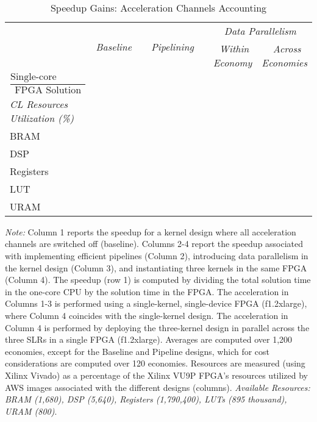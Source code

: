 \documentclass[12pt,american]{article}
\makeatletter
\newcommand{\resultsfolder}{./results}
\newcommand{\devfpgaI}{fpgaI}
\newcommand{\devcpu}{cpu-cores}
\newcommand{\nKMIkI}{nKM4-nk100}
\newcommand{\knlI}{knl-1}
\newcommand{\cpucoreI}{1}
\newcommand{\awsinstfI}{f1.2xlarge\@\xspace}
\newcommand{\fpgaspeedICPUI}{}
\newcommand{\fpgaspeedIknlICPUInKMIkI}{}
\newcommand{\fpgaIbasespeedcpuIbasenKMIkI}{}
\newcommand{\fpgaIpipspeedcpuIbasenKMIkI}{}
\newcommand{\baselineBRAM}{}
\newcommand{\baselineDSP}{}
\newcommand{\baselineRegisters}{}
\newcommand{\baselineLUTs}{}
\newcommand{\baselineURAM}{}
\newcommand{\pipelinenBRAM}{}
\newcommand{\pipelineDSP}{}
\newcommand{\pipelineRegisters}{}
\newcommand{\pipelineLUTs}{}
\newcommand{\pipelineURAM}{}
\newcommand{\withindataparallelBRAM}{}
\newcommand{\withindataparallelDSP}{}
\newcommand{\withindataparallelRegisters}{}
\newcommand{\withindataparallelLUTs}{}
\newcommand{\withindataparallelURAM}{}
\newcommand{\acrossdataparallelBRAM}{}
\newcommand{\acrossdataparallelDSP}{}
\newcommand{\acrossdataparallelRegisters}{}
\newcommand{\acrossdataparallelLUTs}{}
\newcommand{\acrossdataparallelURAM}{}
\newcommand{\CLdesignLUT}{895 thousand}
\newcommand{\CLdesignDSP}{5,640}
\newcommand{\CLdesignRegisters}{1,790,400}
\newcommand{\CLdesignBRAM}{1,680}
\newcommand{\CLdesignURAM}{800}
\makeatother
\begin{document}
\newcommand{\xx}{0.22in}
\begin{table}[ht!]
\setlength\tabcolsep{0pt}
\caption{Speedup Gains: Acceleration Channels Accounting}
\vspace{-0.1in}
\begin{center}
\begin{tabular}{l@{\hskip \xx}c@{\hskip \xx}c@{\hskip \xx} c@{\hskip \xx}c@{\hskip \xx}c@{\hskip \xx} c@{\hskip \xx}}
\toprule
&
\multirow{2}{*}{\textit{Baseline}}&&
\multirow{2}{*}{\textit{Pipelining}} && 
\multicolumn{2}{c}{\textit{Data Parallelism}}\\
\cmidrule{6-7}
&&&&
&\parbox[c]{1.5cm}{\,\,\textit{Within}\\ \textit{Economy}}
&\parbox[c]{1.5cm}{\,\,\,\textit{Across}\\ \textit{Economies}}\\
\parbox[l][1.cm]{3.7cm}{
\footnotesize{$\dfrac{\text{Single-core Execution}}{\text{FPGA Solution}}$}}
&\fpgaIbasespeedcpuIbasenKMIkI&&
\fpgaIpipspeedcpuIbasenKMIkI&&
\fpgaspeedIknlICPUInKMIkI&
\fpgaspeedICPUI\\
\textit{CL Resources Utilization (\%)}\\
BRAM&\baselineBRAM &&\pipelinenBRAM &&\withindataparallelBRAM &\acrossdataparallelBRAM \\
DSP&\baselineDSP&&\pipelineDSP &&\withindataparallelDSP &\acrossdataparallelDSP \\
Registers&\baselineRegisters&&\pipelineRegisters &&\withindataparallelRegisters &\acrossdataparallelRegisters \\
LUT&\baselineLUTs&&\pipelineLUTs &&\withindataparallelLUTs &\acrossdataparallelLUTs \\
URAM&\baselineURAM&&\pipelineURAM &&\withindataparallelURAM &\acrossdataparallelURAM \\
\bottomrule
\end{tabular}
\end{center}
\small \textit{Note:} Column 1 reports the speedup for a kernel design where all acceleration channels are switched off (baseline). Columns 2-4 report the speedup associated with implementing efficient pipelines (Column 2), introducing data parallelism in the kernel design (Column 3), and instantiating three kernels in the same FPGA (Column 4). The speedup (row 1) is computed by dividing the total solution time in the one-core CPU by the solution time in the FPGA. The acceleration in Columns 1-3 is performed using a single-kernel, single-device FPGA (\awsinstfI), where Column 4 coincides with the single-kernel design. The acceleration in Column 4 is performed by deploying the three-kernel design in parallel across the three SLRs in a single FPGA (\awsinstfI). Averages are computed over 1,200 economies, except for the Baseline and Pipeline designs, which for cost considerations are computed over 120 economies. Resources are measured (using Xilinx Vivado) as a percentage of the Xilinx VU9P FPGA's resources utilized by AWS images associated with the different designs (columns). \textit{Available Resources: BRAM (\CLdesignBRAM), DSP (\CLdesignDSP), Registers (\CLdesignRegisters), LUTs (\CLdesignLUT), URAM (\CLdesignURAM)}. 
\label{tab:acccha}
\end{table}
\end{document}
